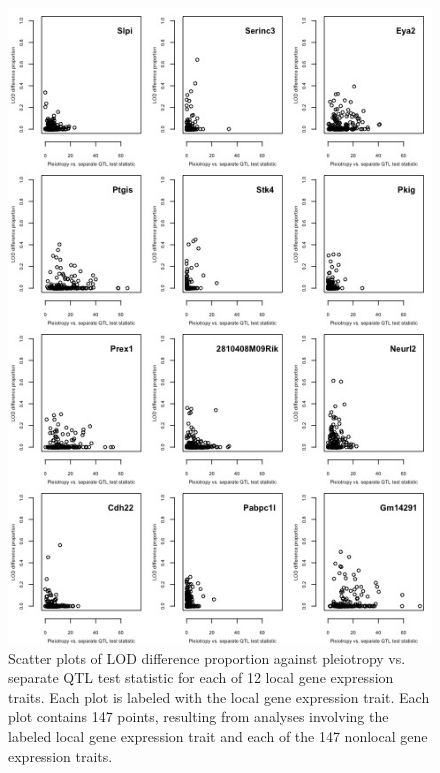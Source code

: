 \documentclass{article}
\begin{document}
\begin{figure}
    \centering
    \includegraphics[height = 0.9\textheight]{baseR-12.jpg}
    \caption{Scatter plots of LOD difference proportion against pleiotropy vs. separate QTL test statistic for each of 12 local gene expression traits. Each plot is labeled with the local gene expression trait. Each plot contains 147 points, resulting from analyses involving the labeled local gene expression trait and each of the 147 nonlocal gene expression traits.}
    \label{fig:nothnf4a-12}
\end{figure}
\end{document}
